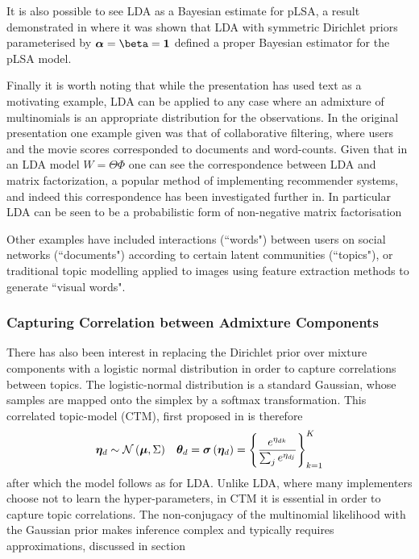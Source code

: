 It is also possible to see LDA as a Bayesian estimate for pLSA, a result demonstrated in \cite{GiKa2003} where it was shown that LDA with symmetric Dirichlet priors parameterised by $\vv{\alpha} = \vv{\beta} = \vv{1}$ defined a proper Bayesian estimator for the pLSA model. 

Finally it is worth noting that while the presentation has used text as a motivating example, LDA can be applied to any case where an admixture of multinomials is an appropriate distribution for the observations. In the original presentation\cite{BleiNgJordan2003} one example given was that of collaborative filtering, where users and the movie scores corresponded to documents and word-counts. Given that in an LDA model $W = \Theta \Phi$ one can see the correspondence between LDA and matrix factorization, a popular method of implementing recommender systems\cite{Salakhutdinov2007}, and indeed this correspondence has been investigated further in\cite{Agarwal2010}. In particular LDA can be seen to be a probabilistic form of non-negative matrix factorisation\cite{Lin2007}

Other examples have included interactions (``words") between users on social networks (``documents") according to certain latent communities (``topics")\cite{Zhang2007}, or traditional topic modelling applied to images\cite{Philbin2008} using feature extraction methods to generate ``visual words". 

\subsubsection{Capturing Correlation between Admixture Components}

There has also been interest in replacing the Dirichlet prior over mixture components with a logistic normal distribution in order to capture correlations between topics. The logistic-normal distribution is a standard Gaussian, whose samples are mapped onto the simplex by a softmax transformation. This correlated topic-model (CTM), first proposed in \cite{Blei2006} is therefore
\begin{align}
\bm \eta_d & \sim \mathcal{N} \left( {\bm \mu}, {\Sigma} \right) & { \bm \theta_d } = \bm \sigma\left(\bm \eta_d\right) = \left\{\frac{e^{\eta_{dk}}}{\sum_j e^{\eta_{dj}}}\right\}_{k=1}^K
\end{align}
after which the model follows as for LDA. Unlike LDA, where many implementers choose not to learn the hyper-parameters, in CTM it is essential in order to capture topic correlations. The non-conjugacy of the multinomial likelihood with the Gaussian prior makes inference complex and typically requires approximations, discussed in section 

